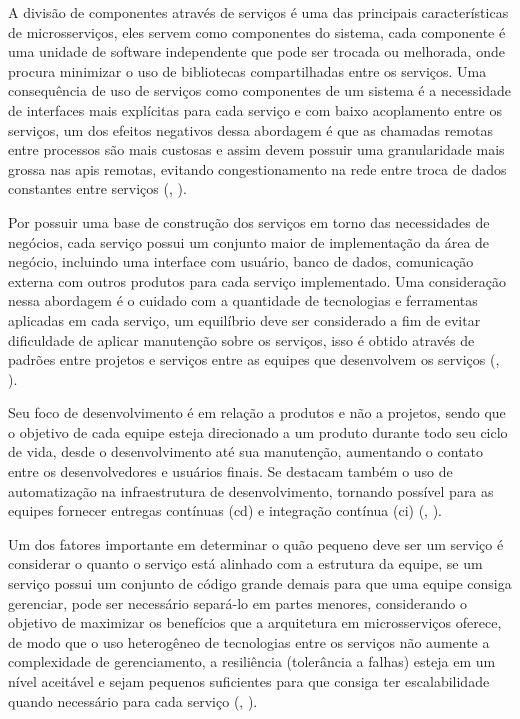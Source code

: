 \documentclass[]{politex}
\begin{document}
A divisão de componentes através de serviços é uma das principais características de microsserviços, eles servem como componentes do sistema, cada componente é uma unidade de software independente que pode ser trocada ou melhorada, onde procura minimizar o uso de bibliotecas compartilhadas entre os serviços. Uma consequência de uso de serviços como componentes de um sistema é a necessidade de interfaces mais explícitas para cada serviço e com baixo acoplamento entre os serviços, um dos efeitos negativos dessa abordagem é que as chamadas remotas entre processos são mais custosas e assim devem possuir uma granularidade mais grossa nas \acrshort{api}s remotas, evitando congestionamento na rede entre troca de dados constantes entre serviços (, \citeyear{martinfowler2014microservices}).

Por possuir uma base de construção dos serviços em torno das necessidades de negócios, cada serviço possui um conjunto maior de implementação da área de negócio, incluindo uma interface com usuário, banco de dados, comunicação externa com outros produtos para cada serviço implementado. Uma consideração nessa abordagem é o cuidado com a quantidade de tecnologias e ferramentas aplicadas em cada serviço, um equilíbrio deve ser considerado a fim de evitar dificuldade de aplicar manutenção sobre os serviços, isso é obtido através de padrões entre projetos e serviços entre as equipes que desenvolvem os serviços (, \citeyear{martinfowler2014microservices}).

Seu foco de desenvolvimento é em relação a produtos e não a projetos, sendo que o objetivo de cada equipe esteja direcionado a um produto durante todo seu ciclo de vida, desde o desenvolvimento até sua manutenção, aumentando o contato entre os desenvolvedores e usuários finais. Se destacam também o uso de automatização na infraestrutura de desenvolvimento, tornando possível para as equipes fornecer entregas contínuas (\acrfull{cd}) e integração contínua (\acrfull{ci}) (, \citeyear{martinfowler2014microservices}).

Um dos fatores importante em determinar o quão pequeno deve ser um serviço é considerar o quanto o serviço está alinhado com a estrutura da equipe, se um serviço possui um conjunto de código grande demais para que uma equipe consiga gerenciar, pode ser necessário separá-lo em partes menores, considerando o objetivo de maximizar os benefícios que a arquitetura em microsserviços oferece, de modo que o uso heterogêneo de tecnologias entre os serviços não aumente a complexidade de gerenciamento, a resiliência (tolerância a falhas) esteja em um nível aceitável e sejam pequenos suficientes para que consiga ter escalabilidade quando necessário para cada serviço (, \citeyear{Newman}).
\end{document}
